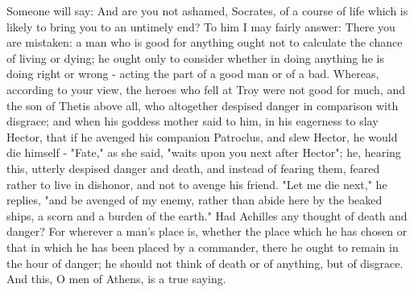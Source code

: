 Someone will say: And are you not ashamed, Socrates, of a course of
life which is likely to bring you to an untimely end? To him I may
fairly answer: There you are mistaken: a man who is good for anything
ought not to calculate the chance of living or dying; he ought only
to consider whether in doing anything he is doing right or wrong -
acting the part of a good man or of a bad. Whereas, according to your
view, the heroes who fell at Troy were not good for much, and the
son of Thetis above all, who altogether despised danger in comparison
with disgrace; and when his goddess mother said to him, in his eagerness
to slay Hector, that if he avenged his companion Patroclus, and slew
Hector, he would die himself - "Fate," as she said, "waits upon you
next after Hector"; he, hearing this, utterly despised danger and
death, and instead of fearing them, feared rather to live in dishonor,
and not to avenge his friend. "Let me die next," he replies, "and
be avenged of my enemy, rather than abide here by the beaked ships,
a scorn and a burden of the earth." Had Achilles any thought of death
and danger? For wherever a man's place is, whether the place which
he has chosen or that in which he has been placed by a commander,
there he ought to remain in the hour of danger; he should not think
of death or of anything, but of disgrace. And this, O men of Athens,
is a true saying. 

